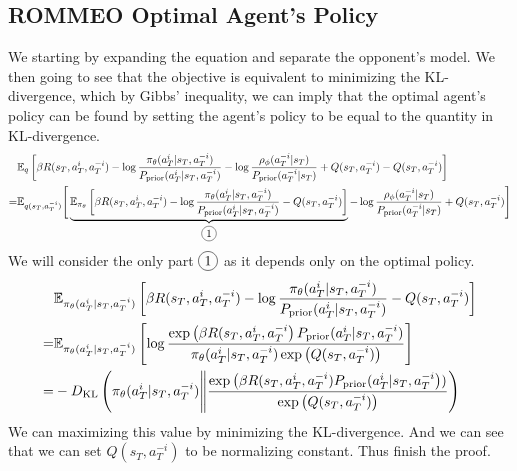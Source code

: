 \subsection{ROMMEO Optimal Agent's Policy}
\label{appx:chap3-ROMMEO-agent-last-time}
We starting by expanding the equation and separate the opponent's model. We then going to see that the objective is equivalent to minimizing the KL-divergence, which by Gibbs' inequality, we can imply that the optimal agent's policy can be found by setting the agent's policy to be equal to the quantity in KL-divergence. 
\begin{equation*}
\begin{aligned}
    &\mathbb{E}_{q}\brackb{ \beta R(s_T, a^i_T, a^{-i}_T)  - \log \frac{\pi_{\theta}(a^i_T | s_T, a^{-i}_T)}{P_{\prior}(a^i_T | s_T, a^{-i}_T) } - \log \frac{\rho_{\phi}(a^{-i}_T | s_T)}{P_{\prior}(a^{-i}_T | s_T)} + Q(s_T, a^{-i}_T) - Q(s_T, a^{-i}_T) } \\
    =&  \mathbb{E}_{q(s_T, a^{-i}_T)}\Bigg[\underbrace{\mathbb{E}_{\pi_{\theta}}\brackb{\beta R(s_T, a^i_T, a^{-i}_T)  - \log \frac{\pi_{\theta}(a^i_T | s_T, a^{-i}_T)}{P_{\prior}(a^i_T | s_T, a^{-i}_T) } - Q(s_T, a^{-i}_T)}}_{\circled{1}} - \log \frac{\rho_{\phi}(a^{-i}_T | s_T)}{P_{\prior}(a^{-i}_T | s_T)} + Q(s_T, a^{-i}_T)\Bigg] \\
\end{aligned}    
\end{equation*}
We will consider the only part $\circled{1}$ as it depends only on the optimal policy. 
\begin{equation*}
\begin{aligned}
    &\mathbb{E}_{\pi_{\theta}(a^i_T | s_T, a^{-i}_T)}\left[ \beta R(s_T, a^i_T, a^{-i}_T)  - \log \frac{\pi_{\theta}(a^i_T | s_T, a^{-i}_T)}{P_{\text{prior}}(a^i_T | s_T, a^{-i}_T) } - Q(s_T, a^{-i}_T) \right] \\
    =&\mathbb{E}_{\pi_{\theta}(a^i_T | s_T, a^{-i}_T)}\left[ \log \frac{\exp \left( \beta R(s_T, a^i_T, a^{-i}_T \right)P_{\text{prior}}(a^i_T | s_T, a^{-i}_T) }{\pi_{\theta}(a^i_T | s_T, a^{-i}_T) \exp\left( Q(s_T, a^{-i}_T) \right)} \right] \\
    =& - D_{\mathrm{KL}}\left( \pi_{\theta}(a^i_T | s_T, a^{-i}_T) \Bigg\| \frac{\exp \left( \beta R(s_T, a^i_T, a^{-i}_T)P_{\text{prior}}(a^i_T | s_T, a^{-i}_T \right)) }{\exp\left( Q(s_T, a^{-i}_T) \right)}   \right)
\end{aligned}
\end{equation*}
We can maximizing this value by minimizing the KL-divergence. And we can see that we can set $Q(s_T, a^{-i}_T)$ to be normalizing constant. Thus finish the proof. 

